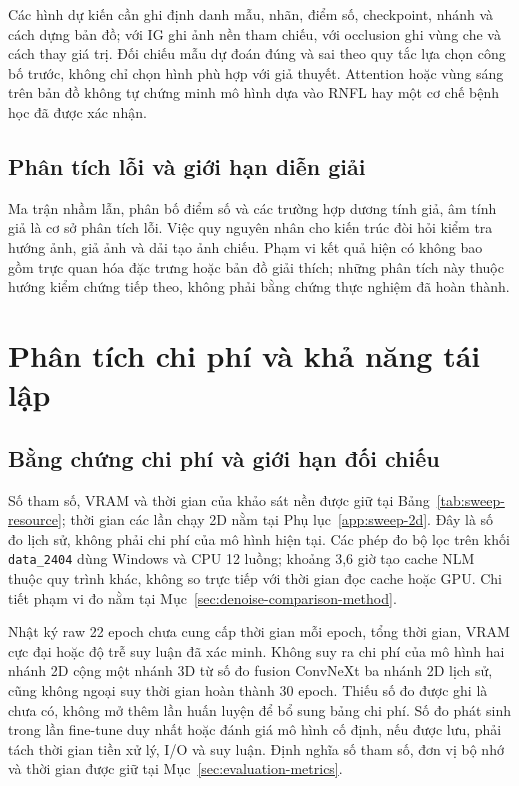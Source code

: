 \documentclass[14pt,a4paper,oneside]{extreport}
\begin{document}
Các hình dự kiến cần ghi định danh mẫu, nhãn, điểm số, checkpoint,
nhánh và cách dựng bản đồ; với IG ghi ảnh nền tham chiếu, với occlusion
ghi vùng che và cách thay giá trị. Đối chiếu mẫu dự đoán đúng và sai
theo quy tắc lựa chọn công bố trước, không chỉ chọn hình phù hợp với
giả thuyết. Attention hoặc vùng sáng trên bản đồ không tự chứng minh
mô hình dựa vào RNFL hay một cơ chế bệnh học đã được xác nhận.

\subsection{Phân tích lỗi và giới hạn diễn giải}
Ma trận nhầm lẫn, phân bố điểm số và các trường hợp dương tính giả,
âm tính giả là cơ sở phân tích lỗi. Việc quy nguyên nhân cho kiến trúc
đòi hỏi kiểm tra hướng ảnh, giả ảnh và dải tạo ảnh chiếu. Phạm vi kết quả
hiện có không bao gồm trực quan hóa đặc trưng hoặc bản đồ giải thích;
những phân tích này thuộc hướng kiểm chứng tiếp theo, không phải bằng chứng
thực nghiệm đã hoàn thành.

\section{Phân tích chi phí và khả năng tái lập}
\label{sec:cost-reproducibility}
\subsection{Bằng chứng chi phí và giới hạn đối chiếu}
Số tham số, VRAM và thời gian của khảo sát nền được giữ tại
Bảng~\ref{tab:sweep-resource}; thời gian các lần chạy 2D nằm tại
Phụ lục~\ref{app:sweep-2d}. Đây là số đo lịch sử, không phải chi phí
của mô hình hiện tại. Các phép đo bộ lọc trên khối \texttt{data\_2404}
dùng Windows và CPU 12 luồng; khoảng 3,6 giờ tạo cache NLM thuộc
quy trình khác, không so trực tiếp với thời gian đọc cache hoặc GPU.
Chi tiết phạm vi đo nằm tại Mục~\ref{sec:denoise-comparison-method}.

Nhật ký raw 22 epoch chưa cung cấp thời gian mỗi epoch, tổng thời
gian, VRAM cực đại hoặc độ trễ suy luận đã xác minh. Không suy ra
chi phí của mô hình hai nhánh 2D cộng một nhánh 3D từ số đo fusion
ConvNeXt ba nhánh 2D lịch sử, cũng không ngoại suy thời gian hoàn
thành 30 epoch. Thiếu số đo được ghi là chưa có, không mở thêm lần
huấn luyện để bổ sung bảng chi phí. Số đo phát sinh trong lần fine-tune
duy nhất hoặc đánh giá mô hình cố định, nếu được lưu, phải tách thời
gian tiền xử lý, I/O và suy luận. Định nghĩa số tham số, đơn vị bộ nhớ
và thời gian được giữ tại Mục~\ref{sec:evaluation-metrics}.
\end{document}
